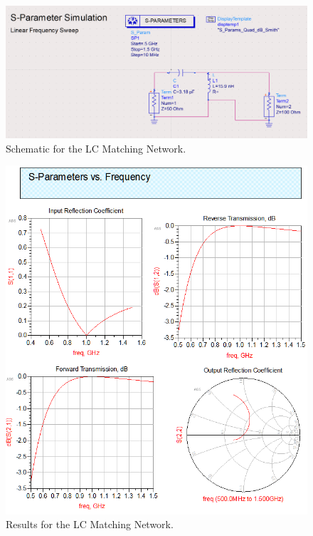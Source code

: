 \begin{figure}[h]
    \centering
    \includegraphics[width=0.8\linewidth]{res/ADS/LCMatchingNetworkSchematic.png}
    \caption{Schematic for the LC Matching Network.}
    \label{fig:}
\end{figure}
\begin{figure}[h]
    \centering
    \includegraphics[width=0.8\linewidth]{res/ADS/LCMatchingNetwork.png}
    \caption{Results for the LC Matching Network.}
    \label{fig:}
\end{figure}

